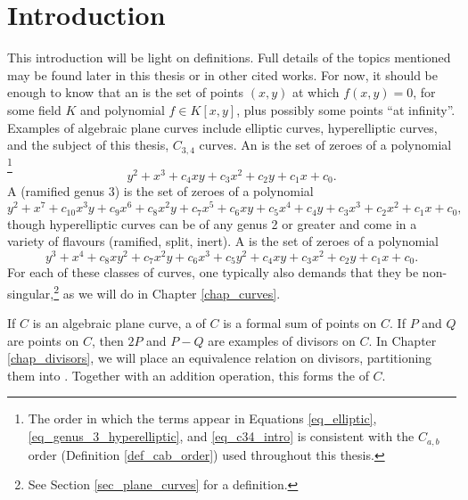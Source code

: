 

\section{Introduction}

This introduction will be light on definitions.
Full details of the topics mentioned may be found later in this thesis or in other cited works.
For now, it should be enough to know that an  is the set of points $(x,y)$
at which $f(x, y) = 0$, for some field $K$ and polynomial $f \in K[x,y]$, plus possibly some points ``at infinity''.
Examples of algebraic plane curves include elliptic curves, hyperelliptic curves,
and the subject of this thesis, $C_{3,4}$ curves.
An  is the set of zeroes of a polynomial
\footnote{The order in which the terms appear in Equations
\ref{eq_elliptic}, \ref{eq_genus_3_hyperelliptic}, and \ref{eq_c34_intro}
is consistent with the $C_{a,b}$ order (Definition \ref{def_cab_order}) used throughout this thesis.}
\begin{equation}
  \label{eq_elliptic}
  y^2 + x^3 + c_4xy + c_3x^2 + c_2y + c_1x + c_0.
\end{equation}
A (ramified genus 3)  is the set of zeroes of a polynomial
\begin{equation}
  \label{eq_genus_3_hyperelliptic}
  y^2 + x^7 + c_{10}x^3y + c_9x^6 + c_8x^2y + c_7x^5 + c_6xy + c_5x^4 + c_4y + c_3x^3 + c_2x^2 + c_1x + c_0,
\end{equation}
though hyperelliptic curves can be of any genus 2 or greater and come in a variety of flavours (ramified, split, inert).
A  is the set of zeroes of a polynomial
\begin{equation}
  \label{eq_c34_intro}
  y^3 + x^4 + c_8xy^2 + c_7x^2y + c_6x^3 + c_5y^2 + c_4xy + c_3x^2 + c_2y + c_1x + c_0.
\end{equation}
For each of these classes of curves, one typically also demands that they be non-singular,\footnote{
See Section \ref{sec_plane_curves} for a definition.}
as we will do in Chapter \ref{chap_curves}.

If $C$ is an algebraic plane curve, a  of $C$ is a formal sum of points on $C$.
If $P$ and $Q$ are points on $C$, then $2P$ and $P - Q$ are examples of divisors on $C$.
In Chapter \ref{chap_divisors}, we will place an equivalence relation on divisors,
partitioning them into .
Together with an addition operation, this forms the  of $C$.



